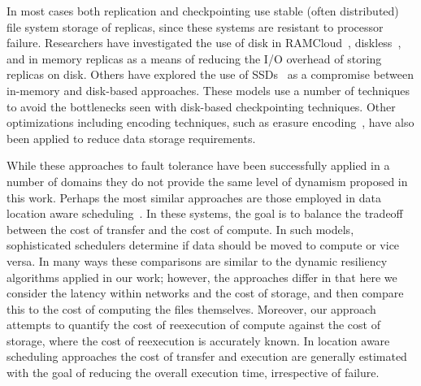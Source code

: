\documentclass{sig-alternate}
\begin{document}
In most cases both replication and checkpointing use stable (often distributed) file system storage of replicas, since these systems are resistant to processor failure. Researchers have investigated the use of disk in RAMCloud~\cite{ramcloud2011},  diskless~\cite{diskless1998, zhen04}, and in memory replicas as a means of reducing the I/O overhead of storing replicas on disk. Others have explored the use of SSDs~\cite{diskless2010} as a compromise between in-memory and  disk-based approaches. These models use a number of techniques to avoid the bottlenecks seen with disk-based checkpointing techniques. Other optimizations including encoding techniques, such as erasure encoding~\cite{star2008, erasure2009}, have also been applied to reduce data storage requirements.


While these approaches to fault tolerance have been successfully applied in a number of domains they do not provide the same level of dynamism proposed in this work. Perhaps the most similar approaches are those employed in data location aware scheduling~\cite{diana2007,peris10location}. In these systems, the goal is to balance the tradeoff between the cost of transfer and the cost of compute. In such models, sophisticated schedulers determine if data should be moved to compute or vice versa. In many ways these comparisons are similar to the dynamic resiliency algorithms applied in our work; however, the approaches differ in that here we consider the latency within networks and the cost of storage, and then compare this to the cost of computing the files themselves. Moreover, our approach attempts to quantify the cost of reexecution of compute against the cost of storage, where the cost of reexecution is accurately known. In location aware scheduling approaches the cost of transfer and execution are generally estimated with the goal of reducing the overall execution time, irrespective of failure.  
\end{document}
